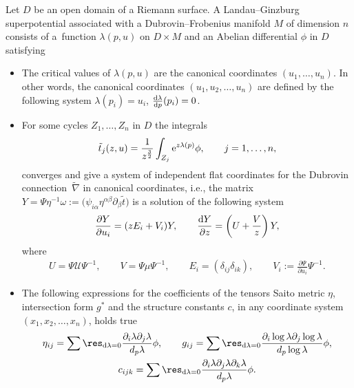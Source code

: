\begin{Definition}\label{Landau--Ginzburg superpotential definition}
Let $D$ be an open domain of a Riemann surface. A Landau--Ginzburg superpotential associated with a Dubrovin--Frobenius manifold $M$ of dimension $n$ consists of a~function $\lambda(p,u)$ on $D \times M$ and an Abelian differential $\phi$ in $D$ satisfying
\begin{itemize}\itemsep=0pt
\item The critical values of $\lambda(p,u)$ are the canonical coordinates $(u_1,\dots,u_n)$. In other words, the canonical coordinates $(u_1,u_2,\dots ,u_n)$ are defined by the following system
$\lambda(p_i)=u_i$, $\frac{{\rm d} \lambda}{{\rm d}p}( p_i)=0$.
\item For some cycles $Z_1,\dots,Z_n$ in $D$ the integrals
\begin{gather}\label{Mirror symmetry}
\tilde t_j(z,u)=\frac{1}{z^{\frac{3}{2}}}\int_{Z_j}{\rm e}^{z\lambda(p)}\phi, \qquad j=1,\dots,n,
\end{gather}
converges and give a system of independent flat coordinates for the Dubrovin connection~$\tilde\nabla$ in canonical coordinates, i.e., the matrix
$Y=\Psi\eta^{-1}\omega:=\bigl(\psi_{i\alpha}\eta^{\alpha\beta}\partial_{\beta}\tilde t \bigr)$
is a solution of the following system
\begin{gather}\label{Dubrovin connection in canonical coordinates 1}
\frac{\partial Y}{\partial u_i}=( zE_i+V_i )Y,\qquad
\frac{{\rm d}Y}{\partial z}=\left( U+\frac{V}{z} \right)Y,
\end{gather}
where
\begin{gather}\label{U,V, Vi in canonical coordinates}
U=\Psi\mathcal{U}\Psi^{-1}, \qquad V=\Psi\mu\Psi^{-1}, \qquad E_i=( \delta_{ij}\delta_{ik} ), \qquad V_i:=\frac{\partial \Psi}{\partial u_i}\Psi^{-1}.
\end{gather}

\item
The following expressions for the coefficients of the tensors Saito metric $\eta$, intersection form $g^{*}$ and the structure constants $c$, in any coordinate system $(x_1,x_2,\dots,x_n)$, holds true
\begin{gather}
\eta_{ij}=\sum \res_{{\rm d}\lambda=0} \frac{ \partial_i\lambda \partial_j\lambda }{d_p\lambda }\phi, \qquad
g_{ij}=\sum \res_{{\rm d}\lambda=0} \frac{ \partial_i\log\lambda \partial_j\log\lambda }{d_p\log\lambda } \phi,\nonumber\\
c_{ijk}=\sum \res_{{\rm d}\lambda=0} \frac{ \partial_i\lambda \partial_j\lambda \partial_k\lambda }{d_p\lambda }\phi.\label{residue expression for eta, intersection form and structure constants}
\end{gather}
\end{itemize}
\end{Definition}

